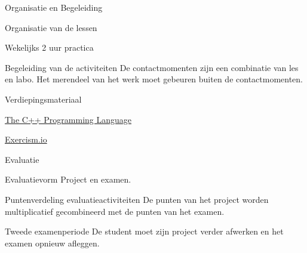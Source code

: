 \documentclass{studiewijzer}
\begin{document}
\showheader

\begin{categorybox}{Organisatie en Begeleiding}
    \begin{category}{Organisatie van de lessen}
        \begin{items}
            \item Wekelijks 2 uur practica
        \end{items}
    \end{category}
    \begin{category}{Begeleiding van de activiteiten}
        De contactmomenten zijn een combinatie van les en labo.
        Het merendeel van het werk moet gebeuren buiten de contactmomenten.
    \end{category}
    \begin{category}{Verdiepingsmateriaal}
        \begin{items}
            \item \href{https://www.stroustrup.com/4th.html}{The C++ Programming Language}
            \item \href{https://exercism.io/}{Exercism.io}
        \end{items}
    \end{category}
\end{categorybox}

\begin{categorybox}{Evaluatie}
    \begin{category}{Evaluatievorm}
        Project en examen.
    \end{category}

    \begin{category}{Puntenverdeling evaluatieactiviteiten}
        De punten van het project worden multiplicatief gecombineerd
        met de punten van het examen.
    \end{category}

    \begin{category}{Tweede examenperiode}
        De student moet zijn project verder afwerken en het examen opnieuw afleggen.
    \end{category}
\end{categorybox}
\end{document}
